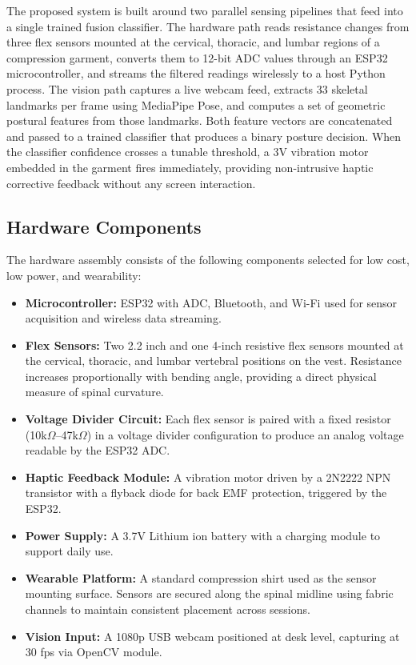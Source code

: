 \documentclass[conference]{IEEEtran}
\begin{document}
The proposed system is built around two parallel sensing 
pipelines that feed into a single trained fusion classifier. 
The hardware path reads resistance changes from three flex 
sensors mounted at the cervical, thoracic, and lumbar regions 
of a compression garment, converts them to 12-bit ADC values 
through an ESP32 microcontroller, and streams the filtered 
readings wirelessly to a host Python process. The vision path 
captures a live webcam feed, extracts 33 skeletal landmarks 
per frame using MediaPipe Pose, and computes a set of 
geometric postural features from those landmarks. Both 
feature vectors are concatenated and passed to a trained 
classifier that produces a binary posture decision. When the 
classifier confidence crosses a tunable threshold, a 3V 
vibration motor embedded in the garment fires immediately, 
providing non-intrusive haptic corrective feedback without 
any screen interaction.

\subsection{Hardware Components}

The hardware assembly consists of the following components 
selected for low cost, low power, and wearability:

\begin{itemize}
    \item \textbf{Microcontroller:} ESP32 with ADC, Bluetooth, and Wi-Fi used for sensor 
    acquisition and wireless data streaming.
    
    \item \textbf{Flex Sensors:} Two 2.2 inch and one 4-inch 
    resistive flex sensors mounted at the 
    cervical, thoracic, and lumbar vertebral positions on the 
    vest. Resistance increases proportionally with bending 
    angle, providing a direct physical measure of spinal 
    curvature.
    
    \item \textbf{Voltage Divider Circuit:} Each flex sensor 
    is paired with a fixed resistor (10k$\Omega$--47k$\Omega$) 
    in a voltage divider configuration to produce an analog 
    voltage readable by the ESP32 ADC.
    
    \item \textbf{Haptic Feedback Module:} A vibration 
    motor driven by a 2N2222 NPN transistor with a  
    flyback diode for back EMF protection, triggered by the ESP32.
    
    \item \textbf{Power Supply:} A 3.7V Lithium ion battery with a charging module to support  daily use.
    
    \item \textbf{Wearable Platform:} A standard compression 
    shirt used as the sensor mounting surface. Sensors are 
    secured along the spinal midline using fabric channels 
    to maintain consistent placement across sessions.
    
    \item \textbf{Vision Input:} A 1080p USB webcam positioned 
    at desk level, capturing at 30 fps via OpenCV module.
\end{itemize}
\end{document}
